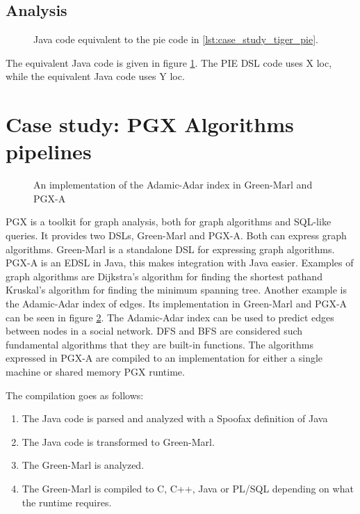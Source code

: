\subsection{Analysis}
\label{sec:evaluation__tiger__analysis}

\begin{figure}
  \caption{Java code equivalent to the pie code in \ref{lst:case_study_tiger_pie}.}
  \label{lst:case_study_tiger_java}
\end{figure}

The equivalent Java code is given in figure \ref{lst:case_study_tiger_java}.
The \ac{PIE} \ac{DSL} code uses X \ac{loc}, while the equivalent Java code uses Y \ac{loc}.

\section{Case study: PGX Algorithms pipelines}
\label{sec:evaluation__database}

\begin{figure}
  \caption{An implementation of the Adamic-Adar index in Green-Marl and \ac{PGX-A}}
  \label{lst:case_study_pgx_a_adamic_adar}
  
  
\end{figure}

\Ac{PGX} is a toolkit for graph analysis, both for graph algorithms and SQL-like queries.
It provides two \acp{DSL}, Green-Marl and \ac{PGX-A}.
Both can express graph algorithms.
Green-Marl is a standalone \ac{DSL} for expressing graph algorithms.
\Ac{PGX-A} is an \ac{EDSL} in Java, this makes integration with Java easier.
Examples of graph algorithms are Dijkstra's algorithm for finding the shortest path\missingref and Kruskal's algorithm for finding the minimum spanning tree\missingref.
Another example is the Adamic-Adar index of edges.
Its implementation in Green-Marl and \ac{PGX-A} can be seen in figure \ref{lst:case_study_pgx_a_adamic_adar}.
The Adamic-Adar index can be used to predict edges between nodes in a social network.
\Ac{DFS} and \ac{BFS} are considered such fundamental algorithms that they are built-in functions.
The algorithms expressed in \ac{PGX-A} are compiled to an implementation for either a single machine or shared memory \ac{PGX} runtime.



The compilation goes as follows:
\begin{enumerate}
  \item The Java code is parsed and analyzed with a Spoofax definition of Java
  \item The Java code is transformed to Green-Marl.
  \item The Green-Marl is analyzed.
  \item The Green-Marl is compiled to C, C++, Java or \ac{PL/SQL} depending on what the runtime requires.
\end{enumerate}

